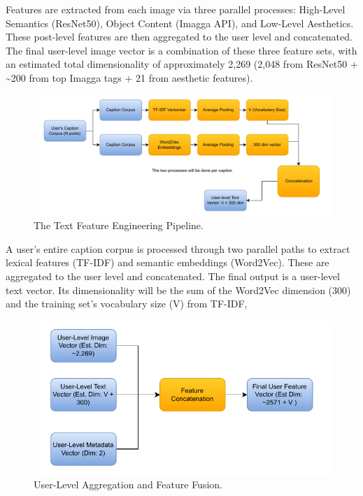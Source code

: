 Features are extracted from each image via three parallel processes: High-Level Semantics (ResNet50), Object Content (Imagga API), and Low-Level Aesthetics. These post-level features are then aggregated to the user level and concatenated. The final user-level image vector is a combination of these three feature sets, with an estimated total dimensionality of approximately 2,269 (2,048 from ResNet50 + \textasciitilde200 from top Imagga tags + 21 from aesthetic features).

\begin{figure}[H]
	\centering
	\includegraphics[width=\textwidth]{"figures/Text-Pipeline-Diagram.pdf"}
	\caption{The Text Feature Engineering Pipeline. }
	\label{fig:text_pipeline_diagram}
\end{figure}

A user's entire caption corpus is processed through two parallel paths to extract lexical features (TF-IDF) and semantic embeddings (Word2Vec). These are aggregated to the user level and concatenated. The final output is a user-level text vector. Its dimensionality will be the sum of the Word2Vec dimension (300) and the training set's vocabulary size (V) from TF-IDF, 


\begin{figure}[H]
	\centering
	\includegraphics[width=\textwidth]{"figures/Fusion-Diagram.pdf"}
	\caption{User-Level Aggregation and Feature Fusion.}
	\label{fig:fusion_diagram}
\end{figure}

